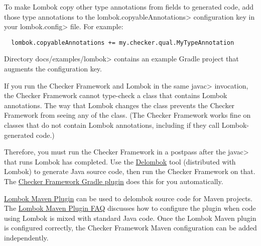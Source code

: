 To make Lombok copy other type annotations from fields to generated code,
add those type annotations to the \<lombok.copyableAnnotations>
configuration key in your \<lombok.config> file.  For example:

\begin{Verbatim}
  lombok.copyableAnnotations += my.checker.qual.MyTypeAnnotation
\end{Verbatim}

Directory \<docs/examples/lombok> contains an example Gradle project that
augments the configuration key.





If you run the Checker Framework and Lombok in the same \<javac>
invocation, the Checker Framework cannot type-check a class that contains
Lombok annotations.  The way that Lombok changes the class prevents the
Checker Framework from seeing any of the class.  (The Checker Framework
works fine on classes that do not contain Lombok annotations, including if
they call Lombok-generated code.)

Therefore, you must run the Checker Framework in a postpass after the
\<javac> that runs Lombok has completed.  Use the
\href{https://projectlombok.org/features/delombok}{Delombok} tool
(distributed with Lombok) to generate Java source code, then run the
Checker Framework on that.  The
\href{https://github.com/kelloggm/checkerframework-gradle-plugin}{Checker
  Framework Gradle plugin} does this for you automatically.



\href{http://anthonywhitford.com/lombok.maven/lombok-maven-plugin/}{Lombok Maven Plugin}
can be used to delombok source code for Maven projects. The
\href{http://anthonywhitford.com/lombok.maven/lombok-maven-plugin/faq.html#alt-src-setup}
{Lombok Maven Plugin FAQ} discusses how to configure the plugin when code
using Lombok is mixed with standard Java code. Once the Lombok Maven plugin
is configured correctly, the Checker Framework Maven configuration can be added
independently.


